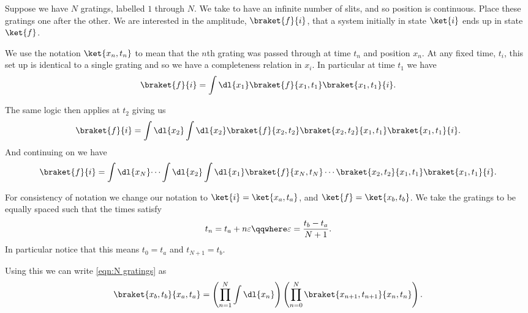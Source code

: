 \documentclass[fleqn]{NotesClass}
\begin{document}
    Suppose we have \(N\) gratings, labelled \(1\) through \(N\). We take to have an infinite number of slits, and so position is continuous.
    Place these gratings one after the other.
    We are interested in the amplitude, \(\braket{f}{i}\), that a system initially in state \(\ket{i}\) ends up in state \(\ket{f}\).
    
    We use the notation \(\ket{x_n, t_n}\) to mean that the \(n\)th grating was passed through at time \(t_n\) and position \(x_n\).
    At any fixed time, \(t_i\), this set up is identical to a single grating and so we have a completeness relation in \(x_i\).
    In particular at time \(t_1\) we have
    \begin{equation}
        \braket{f}{i} = \int \dl{x_1} \braket{f}{x_1, t_1}\braket{x_1, t_1}{i}.
    \end{equation}
    
    The same logic then applies at \(t_2\) giving us
    \begin{equation}
        \braket{f}{i} = \int \dl{x_2} \int \dl{x_2} \braket{f}{x_2, t_2} \braket{x_2, t_2}{x_1, t_1}\braket{x_1, t_1}{i}.
    \end{equation}
    And continuing on we have
    \begin{equation}\label{eqn:N gratings}
        \braket{f}{i} = \int\dl{x_N} \dotsi \int\dl{x_2}\int\dl{x_1} \braket{f}{x_N, t_N} \dotsm \braket{x_2, t_2}{x_1, t_1}\braket{x_1, t_1}{i}.
    \end{equation}
    
    For consistency of notation we change our notation to \(\ket{i} = \ket{x_a, t_a}\), and \(\ket{f} = \ket{x_b, t_b}\).
    We take the gratings to be equally spaced such that the times satisfy
    \begin{equation}
        t_n = t_a + n\varepsilon \qqwhere \varepsilon = \frac{t_b - t_a}{N + 1}.
    \end{equation}
    In particular notice that this means \(t_0 = t_a\) and \(t_{N+1} = t_b\).
    
    Using this we can write \cref{eqn:N gratings} as
    \begin{equation}\label{eqn:product of integrals}
        \braket{x_b, t_b}{x_a, t_a} = \left( \prod_{n=1}^{N} \int \dl{x_n} \right) \left( \prod_{n=0}^{N} \braket{x_{n+1}, t_{n+1}}{x_n, t_n} \right).
    \end{equation}
    
\end{document}
